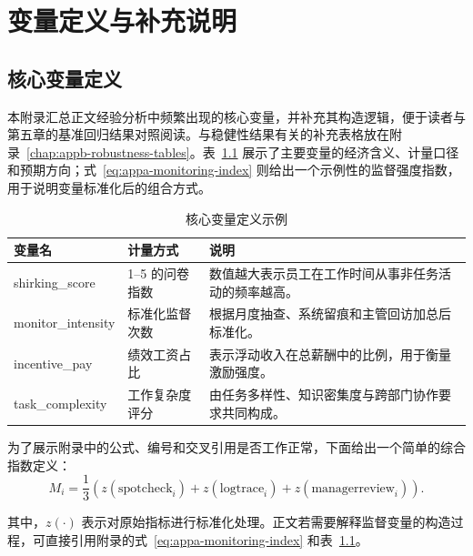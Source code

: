 \chapter{变量定义与补充说明}
\label{chap:appa-variable-notes}

\section{核心变量定义}
\label{sec:appa-variable-definitions}

本附录汇总正文经验分析中频繁出现的核心变量，并补充其构造逻辑，便于读者与第五章的基准回归结果对照阅读。与稳健性结果有关的补充表格放在附录~\ref{chap:appb-robustness-tables}。表~\ref{tab:appa-core-variables} 展示了主要变量的经济含义、计量口径和预期方向；式~\eqref{eq:appa-monitoring-index} 则给出一个示例性的监督强度指数，用于说明变量标准化后的组合方式。

\begin{table}[htbp]
    \centering
    \caption{核心变量定义示例}
    \label{tab:appa-core-variables}
    \begin{tabular}{p{3.1cm}p{4.2cm}p{5.6cm}}
        \toprule
        变量名 & 计量方式 & 说明 \\
        \midrule
        shirking\_score & 1--5 的问卷指数 & 数值越大表示员工在工作时间从事非任务活动的频率越高。 \\
        monitor\_intensity & 标准化监督次数 & 根据月度抽查、系统留痕和主管回访加总后标准化。 \\
        incentive\_pay & 绩效工资占比 & 表示浮动收入在总薪酬中的比例，用于衡量激励强度。 \\
        task\_complexity & 工作复杂度评分 & 由任务多样性、知识密集度与跨部门协作要求共同构成。 \\
        \bottomrule
    \end{tabular}
\end{table}

为了展示附录中的公式、编号和交叉引用是否工作正常，下面给出一个简单的综合指数定义：
\begin{equation}
    \label{eq:appa-monitoring-index}
    M_i = \frac{1}{3}\left(z(\text{spotcheck}_i) + z(\text{logtrace}_i) + z(\text{managerreview}_i)\right).
\end{equation}

其中，$z(\cdot)$ 表示对原始指标进行标准化处理。正文若需要解释监督变量的构造过程，可直接引用附录的式~\eqref{eq:appa-monitoring-index} 和表~\ref{tab:appa-core-variables}。
